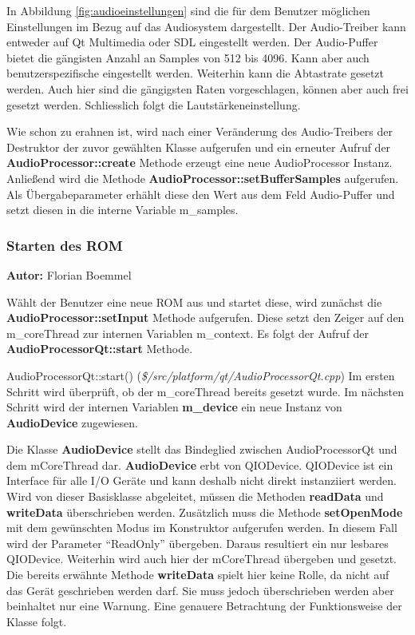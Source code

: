 \documentclass[11pt,a4paper]{scrartcl}
\newcommand{\AutorFlorian} {
    \vspace{-4mm}
    \large \textbf{Autor:} Florian Boemmel \normalsize
    \vspace{2mm}
}
\begin{document}
In Abbildung \ref{fig:audioeinstellungen} sind die f\"ur dem Benutzer m\"oglichen Einstellungen im Bezug auf das Audiosystem dargestellt. Der Audio-Treiber kann entweder auf Qt Multimedia oder SDL eingestellt werden.
Der Audio-Puffer bietet die g\"angisten Anzahl an Samples von 512 bis 4096. Kann aber auch benutzerspezifische eingestellt werden. Weiterhin kann die Abtastrate gesetzt werden. Auch hier sind die g\"angigsten Raten vorgeschlagen, k\"onnen
aber auch frei gesetzt werden. Schlie{ss}lich folgt die Lautst\"arkeneinstellung.

Wie schon zu erahnen ist, wird nach einer Ver\"anderung des Audio-Treibers der Destruktor der zuvor gew\"ahlten Klasse aufgerufen und ein erneuter Aufruf der \textbf{AudioProcessor::create} Methode erzeugt eine neue AudioProcessor Instanz.
Anlie{\ss}end wird die Methode \textbf{AudioProcessor::setBufferSamples} aufgerufen. Als \"Ubergabeparameter erh\"ahlt diese den Wert aus dem Feld Audio-Puffer und setzt diesen in die interne Variable m\_samples.


\subsubsection{Starten des ROM}
\AutorFlorian

W\"ahlt der Benutzer eine neue ROM aus und startet diese, wird zun\"achst die \textbf{AudioProcessor::setInput} Methode aufgerufen. Diese setzt den Zeiger auf den m\_coreThread zur internen Variablen m\_context. Es folgt der Aufruf der
\textbf{AudioProcessorQt::start} Methode.

\vspace{5mm}
\large AudioProcessorQt::start() \normalsize(\textit{\$/src/platform/qt/AudioProcessorQt.cpp})
\vspace{2mm}\newline
Im ersten Schritt wird \"uberpr\"uft, ob der m\_coreThread bereits gesetzt wurde. Im n\"achsten Schritt wird der internen Variablen \textbf{m\_device} ein neue Instanz von \textbf{AudioDevice} zugewiesen.

Die Klasse \textbf{AudioDevice} stellt das Bindeglied zwischen AudioProcessorQt und dem mCoreThread dar. \textbf{AudioDevice} erbt von QIODevice. QIODevice ist ein Interface f\"ur alle I/O Ger\"ate und kann deshalb nicht direkt instanziiert werden.
Wird von dieser Basisklasse abgeleitet, m\"ussen die Methoden \textbf{readData} und \textbf{writeData} \"uberschrieben werden. Zus\"atzlich muss die Methode \textbf{setOpenMode} mit dem gew\"unschten Modus im Konstruktor aufgerufen werden. In diesem Fall wird der Parameter \enquote{ReadOnly} \"ubergeben. Daraus resultiert ein nur lesbares QIODevice. Weiterhin wird auch hier der mCoreThread \"ubergeben und gesetzt. Die bereits erw\"ahnte Methode \textbf{writeData} spielt hier keine Rolle, da nicht auf das Ger\"at geschrieben werden darf. Sie muss jedoch \"uberschrieben werden aber beinhaltet nur eine Warnung. Eine genauere Betrachtung der Funktionsweise der Klasse folgt.
\end{document}
